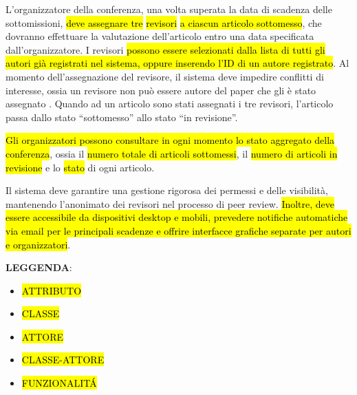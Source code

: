 L’organizzatore della conferenza, una volta superata la data di
scadenza delle sottomissioni, \hl{deve assegnare
  tre} \hl{revisori}
\hl{a ciascun articolo sottomesso}, che dovranno
effettuare la valutazione dell’articolo entro una data specificata
dall’organizzatore. I revisori \hl{possono
  essere selezionati dalla lista di tutti gli autori già registrati
  nel sistema, oppure inserendo l’ID di un autore registrato}. Al
momento dell’assegnazione del revisore, il sistema deve impedire
conflitti di interesse, ossia un revisore non può essere autore del
paper che gli è stato assegnato . Quando ad un articolo sono stati
assegnati i tre revisori, l’articolo passa dallo stato “sottomesso”
allo stato “in revisione”.  \bigskip

\hl{Gli organizzatori possono consultare in ogni
  momento lo stato aggregato della conferenza}, ossia il
\hl{numero totale di articoli sottomessi}, il
\hl{numero di articoli in revisione} e lo
\hl{stato} di ogni articolo.  \bigskip

Il sistema deve garantire una gestione rigorosa dei permessi e delle
visibilità, mantenendo l’anonimato dei revisori nel processo di peer
review. \hl{Inoltre, deve essere accessibile da
  dispositivi desktop e mobili, prevedere notifiche automatiche via
  email per le principali scadenze e offrire interfacce grafiche
  separate per autori e organizzatori}.  \bigskip

\textbf{LEGGENDA}:
\begin{itemize}
\item {}\hl{ATTRIBUTO}
\item {}\hl{CLASSE}
\item {}\hl{ATTORE}
\item {}\hl{CLASSE-ATTORE}
\item {}\hl{FUNZIONALITÁ}
\end{itemize}
